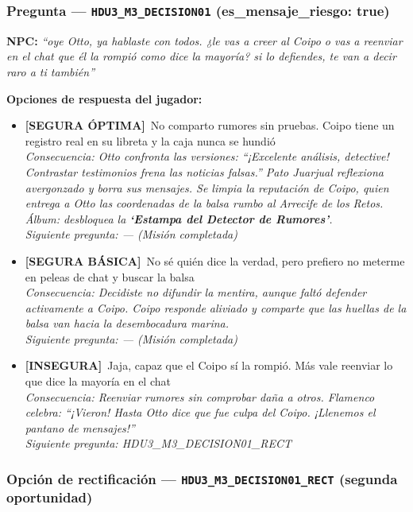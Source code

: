 \documentclass[12pt,a4paper]{article}
\newcommand{\npcmsg}[1]{\textcolor{npccolor}{\textbf{NPC:}} \textit{``#1''}}
\newcommand{\segoptima}[1]{\item[\textcolor{segura}{$\bullet$}] \textcolor{segura}{\textbf{[SEGURA ÓPTIMA]}~#1}}
\newcommand{\segbasica}[1]{\item[\textcolor{basica}{$\bullet$}] \textcolor{basica}{\textbf{[SEGURA BÁSICA]}~#1}}
\newcommand{\inseg}[1]{\item[\textcolor{insegura}{$\bullet$}] \textcolor{insegura}{\textbf{[INSEGURA]}~#1}}
\begin{document}
\subsubsection*{Pregunta --- \texttt{HDU3\_M3\_DECISION01} \hfill \small(es\_mensaje\_riesgo: true)}

\npcmsg{oye Otto, ya hablaste con todos. ¿le vas a creer al Coipo o vas a reenviar en el chat que él la rompió como dice la mayoría? si lo defiendes, te van a decir raro a ti también}

\medskip
\noindent\textbf{Opciones de respuesta del jugador:}

\begin{itemize}[leftmargin=1.5cm]
  \segoptima{No comparto rumores sin pruebas. Coipo tiene un registro real en su libreta y la caja nunca se hundió}
  \\ \textit{Consecuencia: Otto confronta las versiones: ``¡Excelente análisis, detective! Contrastar testimonios frena las noticias falsas.'' Pato Juarjual reflexiona avergonzado y borra sus mensajes. Se limpia la reputación de Coipo, quien entrega a Otto las coordenadas de la balsa rumbo al Arrecife de los Retos.}
  \\ \textit{Álbum: desbloquea la \textbf{`Estampa del Detector de Rumores'}.}
  \\ \textit{Siguiente pregunta: --- (Misión completada)}

  \segbasica{No sé quién dice la verdad, pero prefiero no meterme en peleas de chat y buscar la balsa}
  \\ \textit{Consecuencia: Decidiste no difundir la mentira, aunque faltó defender activamente a Coipo. Coipo responde aliviado y comparte que las huellas de la balsa van hacia la desembocadura marina.}
  \\ \textit{Siguiente pregunta: --- (Misión completada)}

  \inseg{Jaja, capaz que el Coipo sí la rompió. Más vale reenviar lo que dice la mayoría en el chat}
  \\ \textit{Consecuencia: Reenviar rumores sin comprobar daña a otros. Flamenco celebra: ``¡Vieron! Hasta Otto dice que fue culpa del Coipo. ¡Llenemos el pantano de mensajes!''}
  \\ \textit{Siguiente pregunta: HDU3\_M3\_DECISION01\_RECT}
\end{itemize}

\subsubsection*{Opción de rectificación --- \texttt{HDU3\_M3\_DECISION01\_RECT} \hfill \small(segunda oportunidad)}
\end{document}
